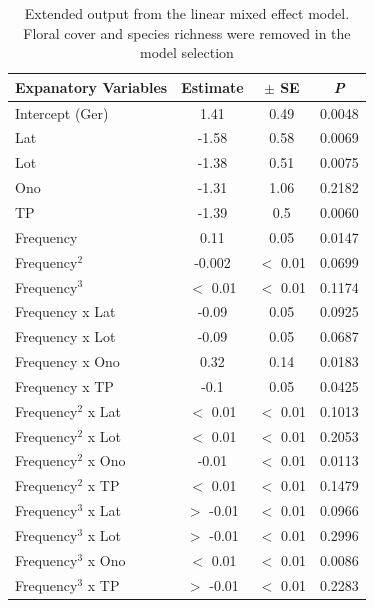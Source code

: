 \begin{table} [!htbp]
	\centering
	\caption{Extended output from the linear mixed effect model. Floral cover and species richness were removed in the model selection }
	\begin{tabular}{lccc}
		\toprule
		\textbf{Expanatory Variables} & \textbf{Estimate} & \textbf{$\pm$ SE} &  \textbf{\textit{P}} \\
		\midrule
		Intercept (Ger) & 1.41 & 0.49  & 0.0048 \\ 
		Lat	& -1.58 & 0.58 & 0.0069 \\ 
		Lot	& -1.38 & 0.51 & 0.0075 \\ 
		Ono	& -1.31 & 1.06 & 0.2182 \\ 
		TP	& -1.39 & 0.5  & 0.0060 \\ 
		\addlinespace[0.2cm]
		Frequency	& 0.11 & 0.05 & 0.0147 \\
		Frequency$^{2}$	& -0.002 &  $<$ 0.01 & 0.0699 \\ 
		Frequency$^{3}$	& $<$ 0.01 & $<$ 0.01 & 0.1174 \\ 
		\addlinespace[0.2cm]
		Frequency x Lat	& -0.09 & 0.05 & 0.0925 \\
		Frequency x Lot	& -0.09 &  0.05 & 0.0687 \\ 
		Frequency x Ono	& 0.32 & 0.14 & 0.0183 \\ 
		Frequency x TP	& -0.1 & 0.05 & 0.0425 \\
		\addlinespace[0.2cm] 
		Frequency$^{2}$ x Lat	& $<$ 0.01 & $<$ 0.01 & 0.1013 \\
		Frequency$^{2}$ x Lot	& $<$ 0.01 & $<$ 0.01 & 0.2053 \\ 
		Frequency$^{2}$ x Ono	& -0.01 & $<$ 0.01 & 0.0113 \\ 
		Frequency$^{2}$ x TP	& $<$ 0.01 & $<$ 0.01 & 0.1479 \\ 
		\addlinespace[0.2cm]
		Frequency$^{3}$ x Lat	& $>$ -0.01 & $<$ 0.01 & 0.0966 \\
		Frequency$^{3}$ x Lot	& $>$ -0.01 & $<$ 0.01 & 0.2996 \\ 
		Frequency$^{3}$ x Ono	& $<$ 0.01 & $<$ 0.01 & 0.0086 \\ 
		Frequency$^{3}$ x TP	& $>$ -0.01 & $<$ 0.01 & 0.2283 \\
		\bottomrule
	\end{tabular}
	\label{tab:summary} 
\end{table}

\newpage


